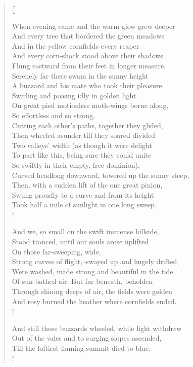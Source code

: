 \documentclass[11pt, a4paper]{article} %
\newcommand{\poemauthorcenter}[1]{\nopagebreak{\centering\footnotesize\textsc{#1}\par}} %
\begin{document}
\begin{verse}[\versewidth]


When evening came and the warm glow grew deeper \\
And every tree that bordered the green meadows \\
And in the yellow cornfields every reaper \\
And every corn-shock stood above their shadows \\
Flung eastward from their feet in longer measure, \\
Serenely far there swam in the sunny height \\
A buzzard and his mate who took their pleasure \\
Swirling and poising idly in golden light. \\
On great pied motionless moth-wings borne along, \\
\vin\vin So effortless and so strong, \\ %
Cutting each other's paths, together they glided, \\
Then wheeled asunder till they soared divided \\
Two valleys' width (as though it were delight \\
To part like this, being sure they could unite \\
So swiftly in their empty, free dominion), \\
Curved headlong downward, towered up the sunny steep, \\
Then, with a sudden lift of the one great pinion, \\
Swung proudly to a curve and from its height \\
Took half a mile of sunlight in one long sweep. \\!


And we, so small on the swift immense hillside, \\
Stood tranced, until our souls arose uplifted \\
\vin\vin On those far-sweeping, wide, \\ %
Strong curves of flight,--swayed up and hugely drifted, \\
Were washed, made strong and beautiful in the tide \\
Of sun-bathed air. But far beneath, beholden \\
Through shining deeps of air, the fields were golden \\
And rosy burned the heather where cornfields ended. \\!


And still those buzzards wheeled, while light withdrew \\
Out of the vales and to surging slopes ascended, \\
Till the loftiest-flaming summit died to blue. \\!
    
\end{verse}


\poemauthorcenter{Martin Armstrong} %

    
\end{document}
